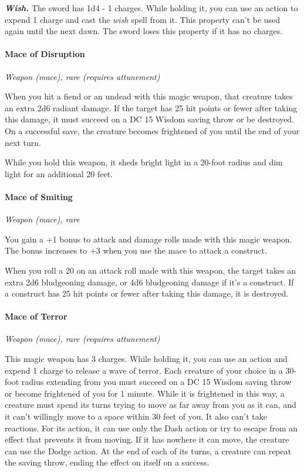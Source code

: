 \documentclass[
]{article}
\begin{document}
\emph{\textbf{Wish.}} The sword has 1d4 - 1 charges. While holding it,
you can use an action to expend 1 charge and cast the \emph{wish} spell
from it. This property can't be used again until the next dawn. The
sword loses this property if it has no charges.

\hypertarget{mace-of-disruption}{%
\paragraph{Mace of Disruption}\label{mace-of-disruption}}

\emph{Weapon (mace), rare (requires attunement)}

When you hit a fiend or an undead with this magic weapon, that creature
takes an extra 2d6 radiant damage. If the target has 25 hit points or
fewer after taking this damage, it must succeed on a DC 15 Wisdom saving
throw or be destroyed. On a successful save, the creature becomes
frightened of you until the end of your next turn.

While you hold this weapon, it sheds bright light in a 20-foot radius
and dim light for an additional 20 feet.

\hypertarget{mace-of-smiting}{%
\paragraph{Mace of Smiting}\label{mace-of-smiting}}

\emph{Weapon (mace), rare}

You gain a +1 bonus to attack and damage rolls made with this magic
weapon. The bonus increases to +3 when you use the mace to attack a
construct.

When you roll a 20 on an attack roll made with this weapon, the target
takes an extra 2d6 bludgeoning damage, or 4d6 bludgeoning damage if it's
a construct. If a construct has 25 hit points or fewer after taking this
damage, it is destroyed.

\hypertarget{mace-of-terror}{%
\paragraph{Mace of Terror}\label{mace-of-terror}}

\emph{Weapon (mace), rare (requires attunement)}

This magic weapon has 3 charges. While holding it, you can use an action
and expend 1 charge to release a wave of terror. Each creature of your
choice in a 30-foot radius extending from you must succeed on a DC 15
Wisdom saving throw or become frightened of you for 1 minute. While it
is frightened in this way, a creature must spend its turns trying to
move as far away from you as it can, and it can't willingly move to a
space within 30 feet of you. It also can't take reactions. For its
action, it can use only the Dash action or try to escape from an effect
that prevents it from moving. If it has nowhere it can move, the
creature can use the Dodge action. At the end of each of its turns, a
creature can repeat the saving throw, ending the effect on itself on a
success.
\end{document}
